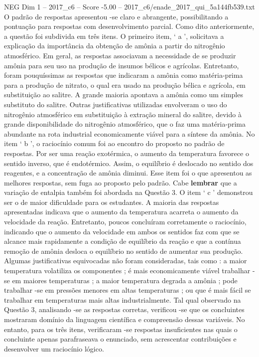 \begin{textsample}{NEG Dim 1 – 2017\_c6 – Score -5.00 – 2017\_c6/enade\_2017\_qui\_5a144fb539.txt}
O padrão de respostas apresentou -se claro e abrangente, possibilitando a pontuação para respostas com desenvolvimento parcial.
Como dito anteriormente, a questão foi subdivida em três itens.
O primeiro item, ‘ a ’, solicitava a explicação da importância da obtenção de amônia a partir do nitrogênio atmosférico.
Em geral, as respostas associavam a necessidade de se produzir amônia para seu uso na produção de insumos bélicos e agrícolas.
Entretanto, foram pouquíssimas as respostas que indicaram a amônia como matéria-prima para a produção de nitrato, o qual era usado na produção bélica e agrícola, em substituição ao salitre.
A grande maioria apontava a amônia como um simples substituto do salitre.
Outras justificativas utilizadas envolveram o uso do nitrogênio atmosférico em substituição à extração mineral do salitre, devido à grande disponibilidade do nitrogênio atmosférico, que o faz uma matéria-prima abundante na rota industrial economicamente viável para a síntese da amônia.
No item ‘ b ’, o raciocínio comum foi ao encontro do proposto no padrão de respostas.
Por ser uma reação exotérmica, o aumento da temperatura favorece o sentido inverso, que é endotérmico.
Assim, o equilíbrio é deslocado no sentido dos reagentes, e a concentração de amônia diminui.
Esse item foi o que apresentou as melhores respostas, sem fuga ao proposto pelo padrão.
Cabe \textbf{lembrar} que a variação de entalpia também foi abordada na Questão 3.
O item ‘ c ’ demonstrou ser o de maior dificuldade para os estudantes.
A maioria das respostas apresentadas indicava que o aumento da temperatura acarreta o aumento da velocidade da reação.
Entretanto, poucos concluíram corretamente o raciocínio, indicando que o aumento da velocidade em ambos os sentidos faz com que se alcance mais rapidamente a condição de equilíbrio da reação e que a contínua remoção de amônia desloca o equilíbrio no sentido de aumentar sua produção.
Algumas justificativas equivocadas não foram consideradas, tais como : a maior temperatura volatiliza os componentes ; é mais economicamente viável trabalhar -se em maiores temperaturas ; a maior temperatura degrada a amônia ; pode trabalhar -se em pressões menores em altas temperaturas ; ou que é mais fácil se trabalhar em temperaturas mais altas industrialmente.
Tal qual observado na Questão 3, analisando -se as respostas corretas, verificou -se que os concluintes mostraram domínio da linguagem científica e compreensão dessas variáveis.
No entanto, para os três itens, verificaram -se respostas insuficientes nas quais o concluinte apenas parafraseava o enunciado, sem acrescentar contribuições e desenvolver um raciocínio lógico.

\end{textsample}
